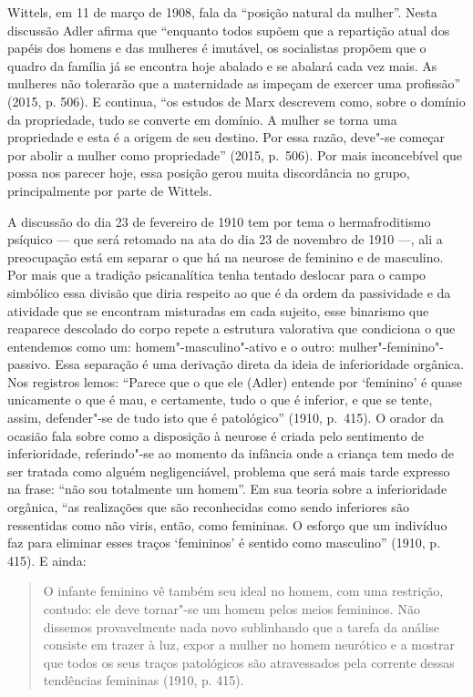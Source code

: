Wittels, em 11 de março de 1908, fala da ``posição natural da mulher''.
Nesta discussão Adler afirma que ``enquanto todos supõem que a repartição
atual dos papéis dos homens e das mulheres é imutável, os socialistas
propõem que o quadro da família já se encontra hoje abalado e se abalará
cada vez mais. As mulheres não tolerarão que a maternidade as impeçam de
exercer uma profissão'' (2015, p. 506). E continua, ``os estudos de Marx
descrevem como, sobre o domínio da propriedade, tudo se converte em
domínio. A mulher se torna uma propriedade e esta é a origem de seu
destino. Por essa razão, deve"-se começar por abolir a mulher como
propriedade'' (2015, p.~506). Por mais inconcebível que possa nos parecer
hoje, essa posição gerou muita discordância no grupo, principalmente por
parte de Wittels.

A discussão do dia 23 de fevereiro de 1910 tem por tema o
hermafroditismo psíquico --- que será retomado na ata do dia 23 de
novembro de 1910 ---, ali a preocupação está em separar o que há na
neurose de feminino e de masculino. Por mais que a tradição
psicanalítica tenha tentado deslocar para o campo simbólico essa divisão
que diria respeito ao que é da ordem da passividade e da atividade que
se encontram misturadas em cada sujeito, esse binarismo que reaparece
descolado do corpo repete a estrutura valorativa que condiciona o que
entendemos como um: homem"-masculino"-ativo e o outro:
mulher"-feminino"-passivo. Essa separação é uma derivação direta da ideia
de inferioridade orgânica. Nos registros lemos: ``Parece que o que ele
(Adler) entende por `feminino' é quase unicamente o que é mau, e
certamente, tudo o que é inferior, e que se tente, assim, defender"-se de
tudo isto que é patológico'' (1910, p.~415). O orador da ocasião fala
sobre como a disposição à neurose é criada pelo sentimento de
inferioridade, referindo"-se ao momento da infância onde a criança tem
medo de ser tratada como alguém negligenciável, problema que será mais
tarde expresso na frase: ``não sou totalmente um homem''. Em sua teoria
sobre a inferioridade orgânica, ``as realizações que são reconhecidas
como sendo inferiores são ressentidas como não viris, então, como
femininas. O esforço que um indivíduo faz para eliminar esses traços
`femininos' é sentido como masculino'' (1910, p. 415). E ainda:

\begin{quote}
O infante feminino vê também seu ideal no homem, com uma restrição,
contudo: ele deve tornar"-se um homem pelos meios femininos. Não dissemos
provavelmente nada novo sublinhando que a tarefa da análise consiste em
trazer à luz, expor a mulher no homem neurótico e a mostrar que todos os
seus traços patológicos são atravessados pela corrente dessas tendências
femininas (1910, p. 415).
\end{quote}

